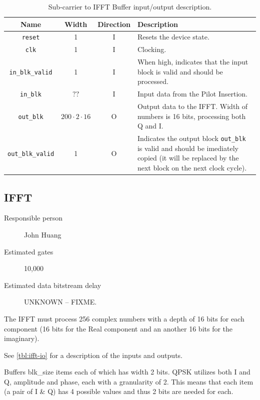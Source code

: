 \documentclass[dvips,10pt,twocolumn]{article}
\newcommand{\wire}{\texttt}
\begin{document}
\begin{table}\begin{tabularx}{\linewidth}{c|c|c|X}
	\label{tbl:ifft-buffer-io}
			
	Name & Width & Direction & Description \\ \hline

	\wire{reset} & 1 & I & Resets the device state. \\

	\wire{clk}   & 1 & I & Clocking. \\

	\wire{in\_blk\_valid} & 1 & I & When high, indicates that the input block is
	valid and should be processed. \\

	\wire{in\_blk} & $??$ & I & Input data from the Pilot Insertion. \\

	\wire{out\_blk} & $200 \cdot 2 \cdot 16$ & O & Output data to the IFFT. Width of
	numbers is 16 bits, processing both Q and I. \\

	\wire{out\_blk\_valid} & 1 & O & Indicates the output block
	\wire{out\_blk} is valid and should be imediately copied (it will be
	replaced by the next block on the next clock cycle).

\end{tabularx}
\caption{Sub-carrier to IFFT Buffer input/output description.}
\end{table}

\subsection{IFFT}
\label{sec:ifft}
\begin{description}
	\item[Responsible person] John Huang
	\item[Estimated gates] 10,000
	\item[Estimated data bitstream delay] UNKNOWN -- FIXME.
\end{description}

The IFFT must process 256 complex numbers with a depth of 16 bits for each
component (16 bits for the Real component and an another 16 bits for the
imaginary).

See \autoref{tbl:ifft-io} for a description of the inputs and outputs.
	
	Buffers blk\_size items each of which has width 2 bits.
	QPSK utilizes both I and Q, amplitude and phase, each with
	a granularity of 2. This means that each item (a pair of I
	\& Q) has 4 possible values and thus 2 bits are needed for
	each.
\end{document}
